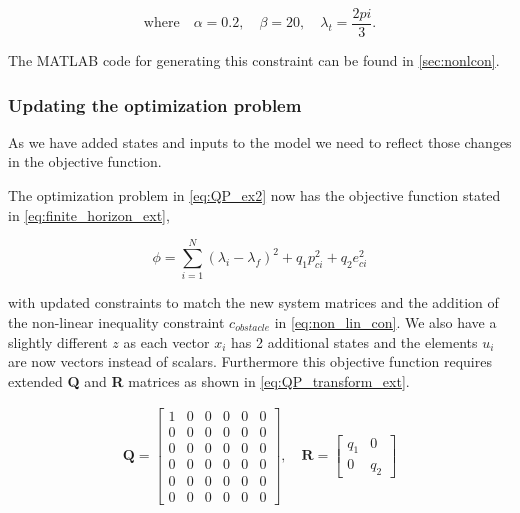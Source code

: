 \begin{equation*}
    \text{where} \quad \alpha = 0.2, \quad \beta = 20, \quad \lambda_t = \frac{2pi}{3}.\nonumber
\end{equation*}

The MATLAB code for generating this constraint can be found in \cref{sec:nonlcon}.


\subsubsection{Updating the optimization problem}\label{sec:ex4.3}

As we have added states and inputs to the model we need to reflect those changes in the objective function.

The optimization problem in \cref{eq:QP_ex2} now has the objective function stated in \cref{eq:finite_horizon_ext},

\begin{equation}\label{eq:finite_horizon_ext}
    \phi = \sum_{i=1}^{N} (\lambda_i - \lambda_f)^2 + q_1p_{ci}^2 + q_2e_{ci}^2
\end{equation}

with updated constraints to match the new system matrices and the addition of the non-linear inequality constraint $c_{obstacle}$ in \cref{eq:non_lin_con}.
We also have a slightly different $z$ as each vector $x_i$ has 2 additional states and the elements $u_i$ are now vectors instead of scalars. Furthermore this objective function requires extended \textbf{Q} and \textbf{R} matrices as shown in \cref{eq:QP_transform_ext}.

\begin{equation}\label{eq:QP_transform_ext}
    \begin{aligned}
        \mathbf{Q} =
        \begin{bmatrix} 
        1 & 0 & 0 & 0 & 0 & 0 \\ 0 & 0 & 0 & 0 & 0 & 0 \\ 0 & 0 & 0 & 0 & 0 & 0 \\ 
        0 & 0 & 0 & 0 & 0 & 0 \\ 0 & 0 & 0 & 0 & 0 & 0 \\ 0 & 0 & 0 & 0 & 0 & 0
        \end{bmatrix}, \quad
        \mathbf{R} =
        \begin{bmatrix} q_1 & 0 \\ 0 & q_2  \end{bmatrix}
    \end{aligned}
\end{equation}

